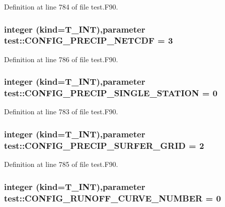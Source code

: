 Definition at line 784 of file test.F90.

\hypertarget{namespacetest_aabfd0fd8168bc7f0d7a8e12b40776c4e}{
\subsubsection[{CONFIG\_\-PRECIP\_\-NETCDF}]{\setlength{\rightskip}{0pt plus 5cm}integer (kind={\bf T\_\-INT}),parameter {\bf test::CONFIG\_\-PRECIP\_\-NETCDF} = 3}}
\label{namespacetest_aabfd0fd8168bc7f0d7a8e12b40776c4e}


Definition at line 786 of file test.F90.

\hypertarget{namespacetest_a21c652de204eff57b4a764e644f1c2d6}{
\subsubsection[{CONFIG\_\-PRECIP\_\-SINGLE\_\-STATION}]{\setlength{\rightskip}{0pt plus 5cm}integer (kind={\bf T\_\-INT}),parameter {\bf test::CONFIG\_\-PRECIP\_\-SINGLE\_\-STATION} = 0}}
\label{namespacetest_a21c652de204eff57b4a764e644f1c2d6}


Definition at line 783 of file test.F90.

\hypertarget{namespacetest_a5cd862c804720044203e177379939919}{
\subsubsection[{CONFIG\_\-PRECIP\_\-SURFER\_\-GRID}]{\setlength{\rightskip}{0pt plus 5cm}integer (kind={\bf T\_\-INT}),parameter {\bf test::CONFIG\_\-PRECIP\_\-SURFER\_\-GRID} = 2}}
\label{namespacetest_a5cd862c804720044203e177379939919}


Definition at line 785 of file test.F90.

\hypertarget{namespacetest_aa4c0a351964701262a252e1174d8959c}{
\subsubsection[{CONFIG\_\-RUNOFF\_\-CURVE\_\-NUMBER}]{\setlength{\rightskip}{0pt plus 5cm}integer (kind={\bf T\_\-INT}),parameter {\bf test::CONFIG\_\-RUNOFF\_\-CURVE\_\-NUMBER} = 0}}
\label{namespacetest_aa4c0a351964701262a252e1174d8959c}


